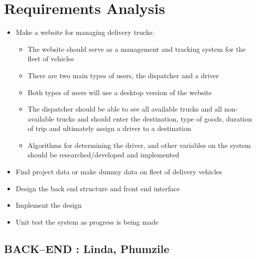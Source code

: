 \documentclass[paper=a4, fontsize=11pt]{scrartcl} %
\numberwithin{equation}{section} %
\numberwithin{figure}{section} %
\numberwithin{table}{section} %
\begin{document}

\section{	Requirements Analysis}

\begin{itemize}
	\item Make a website for managing delivery trucks: 
		\begin{itemize}
		 
			\begin{itemize}
			\item The website should serve as a management and tracking system for the fleet of vehicles
			\item There are two main types of users, the dispatcher and a driver
			\item Both types of users will use a desktop version of the website
			\item  The dispatcher should be able to see all available trucks and all non-available trucks and should enter the destination, type of goods, duration of trip and ultimately assign a driver to a destination
			\item Algorithms for determining the driver, and other variables on the system should be researched/developed and implemented
			\end{itemize}
		 
		\end{itemize}
		\item	Find project data or make dummy data on fleet of delivery vehicles
	\item	Design the back end structure and front end interface
		\item	Implement the design 
		\item	Unit test the system as progress is being made
	 
\end{itemize}






\subsection{	BACK--END : Linda, Phumzile}
\end{document}
